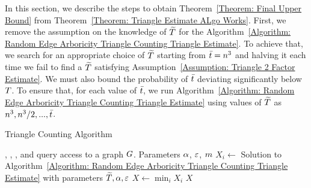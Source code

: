 
In this section, we describe the steps to obtain Theorem~\ref{Theorem: Final Upper Bound} from Theorem~\ref{Theorem: Triangle Estimate ALgo Works}. First, we remove the assumption on the knowledge of $\widetilde{T}$ for the Algorithm~\ref{Algorithm: Random Edge Arboricity Triangle Counting Triangle Estimate}. To achieve that, we search for an appropriate choice of $\widetilde{T}$ starting from $\bar{t} = n^3$ and halving it each time we fail to find a $\widetilde{T}$ satisfying Assumption~\ref{Assumption: Triangle 2 Factor Estimate}.
We must also bound the probability of $\bar{t}$ deviating significantly below $T$. To ensure that, for each value of $\bar{t}$, we run Algorithm~\ref{Algorithm: Random Edge Arboricity Triangle Counting Triangle Estimate} using values of $\widetilde{T}$ as $n^3,n^3/2,...,\bar{t}$.

\begin{algorithm}
    \caption{Triangle Counting Algorithm}\label{Algorithm: Final Search}
    \begin{algorithmic}[1]
        \Require \degreeq{}, \neighbourq{}, \edgeexistsq{}, and \randedgeq{} query access to a graph $G$. Parameters $\alpha$, $\varepsilon$, $m$ 
        \label{Line: Bar T Range}
             \label{Line: EstTriangle Range}
                    \State $X_i \gets$ Solution to Algorithm~\ref{Algorithm: Random Edge Arboricity Triangle Counting Triangle Estimate} with parameters $\widetilde{T},\alpha,\varepsilon$
                    \State $X \gets \min_i X_i$
                        \State \Return $X$
                    \EndIf
                \EndFor
            \EndFor
        \EndFor
    \end{algorithmic}
\end{algorithm}

